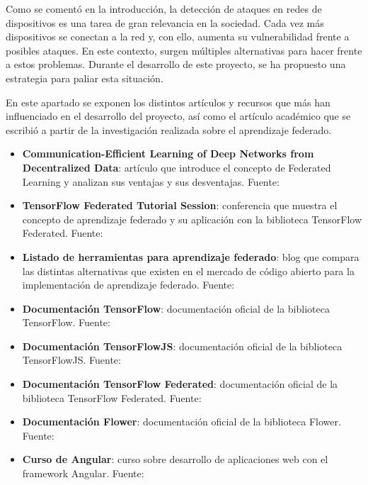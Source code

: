 
Como se comentó en la introducción, la detección de ataques en redes de dispositivos es una tarea de gran relevancia en la sociedad. Cada vez más dispositivos se conectan a la red y, con ello, aumenta su vulnerabilidad frente a posibles ataques. En este contexto, surgen múltiples alternativas para hacer frente a estos problemas. Durante el desarrollo de este proyecto, se ha propuesto una estrategia para paliar esta situación.

En este apartado se exponen los distintos artículos y recursos que más han influenciado en el desarrollo del proyecto, así como el artículo académico que se escribió a partir de la investigación realizada sobre el aprendizaje federado.

\begin{itemize}
    \item \textbf{Communication-Efficient Learning of Deep Networks from Decentralized Data}: artículo que introduce el concepto de Federated Learning y analizan sus ventajas y sus desventajas. Fuente: \cite{aprendizaje_federado_articulo}
    \item \textbf{TensorFlow Federated Tutorial Session}: conferencia que muestra el concepto de aprendizaje federado y su aplicación con la biblioteca TensorFlow Federated. Fuente: \cite{tensorflow_federated_tutorial}
    \item \textbf{Listado de herramientas para aprendizaje federado}: blog que compara las distintas alternativas que existen en el mercado de código abierto para la implementación de aprendizaje federado. Fuente: \cite{open_source_frameworks}
    \item \textbf{Documentación TensorFlow}: documentación oficial de la biblioteca TensorFlow. Fuente: \cite{tensorflow}
    \item \textbf{Documentación TensorFlowJS}: documentación oficial de la biblioteca TensorFlowJS. Fuente: \cite{tensorflowjs}
    \item \textbf{Documentación TensorFlow Federated}: documentación oficial de la biblioteca TensorFlow Federated. Fuente: \cite{tensorflow_federated}
    \item \textbf{Documentación Flower}: documentación oficial de la biblioteca Flower. Fuente: \cite{flower}
    \item \textbf{Curso de Angular}: curso sobre desarrollo de aplicaciones web con el framework Angular. Fuente: \cite{angular}
\end{itemize}

